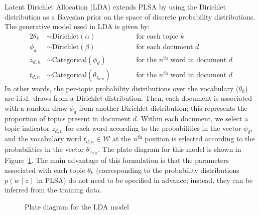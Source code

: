 \documentclass{article}
\newcommand{\nth}{^{\text{th}}}
\begin{document}
Latent Dirichlet Allocation (LDA) extends PLSA by using the Dirichlet distribution as a Bayesian prior on the space of discrete probability distributions.
The generative model used in LDA is given by:
\begin{alignat*}{2}
\theta_k &\sim \text{Dirichlet}(\alpha) &\qquad&\text{for each topic $k$} \\
\phi_d &\sim \text{Dirichlet}(\beta) &\qquad&\text{for each document $d$} \\
z_{d,n} &\sim \text{Categorical}(\phi_d) &\qquad&\text{for the $n\nth$ word in document $d$} \\
t_{d,n} &\sim \text{Categorical}(\theta_{z_{d,n}}) &\qquad&\text{for the $n\nth$ word in document $d$}
\end{alignat*}
In other words, the per-topic probability distributions over the vocabulary ($\theta_k$) are i.i.d.\ draws from a Dirichlet distribution.
Then, each document is associated with a random draw $\phi_d$ from another Dirichlet distribution; this represents the proportion of topics present in document $d$.
Within each document, we select a topic indicator $z_{d,n}$ for each word according to the probabilities in the vector $\phi_d$, and the vocabulary word $t_{d,n} \in \mathcal W$ at the $n\nth$ position is selected according to the probabilities in the vector $\theta_{z_{d,n}}$.
The plate diagram for this model is shown in Figure~\ref{fig:plate-lda}.
The main advantage of this formulation is that the parameters associated with each topic $\theta_k$ (corresponding to the probability distributions $p(w \mid z)$ in PLSA) do not need to be specified in advance;
instead, they can be inferred from the training data.

\begin{figure}[htb]
%
\centering
{}
%
\caption{Plate diagram for the LDA model}
\label{fig:plate-lda}
\end{figure}
\end{document}
